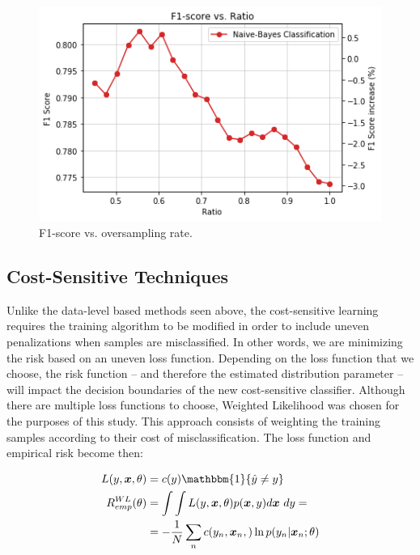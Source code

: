 \documentclass[conference]{IEEEtran}
\begin{document}
	\begin{figure}[h]
		\includegraphics[scale=0.45]{Oversampling_F1_Score}
		\centering
		\caption{F1-score vs. oversampling rate.}
		\label{fig:Oversampling_F1_Score}
	\end{figure}

	\subsection{Cost-Sensitive Techniques}
	Unlike the data-level based methods seen above, the cost-sensitive learning requires the training algorithm to be modified in order to include uneven penalizations when samples are misclassified. In other words, we are minimizing the risk based on an uneven loss function. Depending on the loss function that we choose, the risk function -- and therefore the estimated distribution parameter -- will impact the decision boundaries of the new cost-sensitive classifier. Although there are multiple loss functions to choose, Weighted Likelihood was chosen for the purposes of this study. This approach consists of weighting the training samples according to their cost of misclassification. The loss function and empirical risk become then:
	
	\begin{equation*}
	\begin{aligned} \label{costWL}
			L(y,\boldsymbol x, \theta) &= c(y)\mathbbm{1}\{ \hat y \neq y \} \\
			R^{WL}_{emp}(\theta) &= \int \int L(y,\boldsymbol x, \theta) p(\boldsymbol x, y) d\boldsymbol x \text{ }dy=\\
				      &=-\frac{1}{N} \sum_n c(y_n,\boldsymbol x_n,) \ln p(y_n | \boldsymbol x_n;\theta)
		\end{aligned}
	\end{equation*}
	
\end{document}
